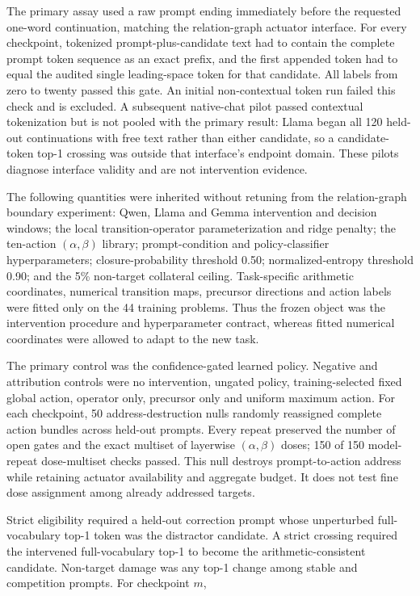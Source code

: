 \documentclass[10pt]{article}
\begin{document}
The primary assay used a raw prompt ending immediately before the requested one-word continuation, matching the relation-graph actuator interface. For every checkpoint, tokenized prompt-plus-candidate text had to contain the complete prompt token sequence as an exact prefix, and the first appended token had to equal the audited single leading-space token for that candidate. All labels from zero to twenty passed this gate. An initial non-contextual token run failed this check and is excluded. A subsequent native-chat pilot passed contextual tokenization but is not pooled with the primary result: Llama began all 120 held-out continuations with free text rather than either candidate, so a candidate-token top-1 crossing was outside that interface's endpoint domain. These pilots diagnose interface validity and are not intervention evidence.

The following quantities were inherited without retuning from the relation-graph boundary experiment: Qwen, Llama and Gemma intervention and decision windows; the local transition-operator parameterization and ridge penalty; the ten-action \((\alpha,\beta)\) library; prompt-condition and policy-classifier hyperparameters; closure-probability threshold 0.50; normalized-entropy threshold 0.90; and the 5\% non-target collateral ceiling. Task-specific arithmetic coordinates, numerical transition maps, precursor directions and action labels were fitted only on the 44 training problems. Thus the frozen object was the intervention procedure and hyperparameter contract, whereas fitted numerical coordinates were allowed to adapt to the new task.

The primary control was the confidence-gated learned policy. Negative and attribution controls were no intervention, ungated policy, training-selected fixed global action, operator only, precursor only and uniform maximum action. For each checkpoint, 50 address-destruction nulls randomly reassigned complete action bundles across held-out prompts. Every repeat preserved the number of open gates and the exact multiset of layerwise \((\alpha,\beta)\) doses; 150 of 150 model-repeat dose-multiset checks passed. This null destroys prompt-to-action address while retaining actuator availability and aggregate budget. It does not test fine dose assignment among already addressed targets.

Strict eligibility required a held-out correction prompt whose unperturbed full-vocabulary top-1 token was the distractor candidate. A strict crossing required the intervened full-vocabulary top-1 to become the arithmetic-consistent candidate. Non-target damage was any top-1 change among stable and competition prompts. For checkpoint \(m\),
\end{document}
